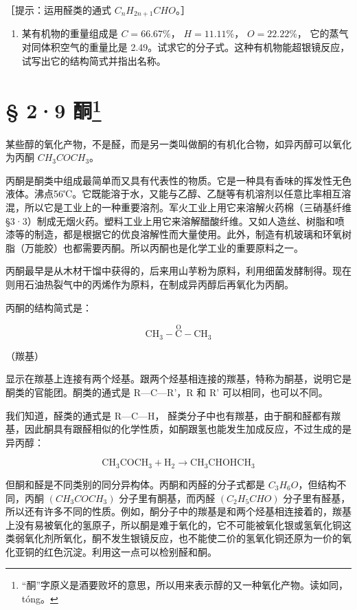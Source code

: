 ［提示：运用醛类的通式 \(C_{n}H_{2n+1}CHO\)。］

\begin{enumerate}[start=5]
\item
  某有机物的重量组成是 \(C = 66.67\%\)， \(H = 11.11\%\)，
  \(O = 22.22\%\)， 它的蒸气对同体积空气的重量比是
  2.49。试求它的分子式。这种有机物能超银镜反应，
  试写出它的结构简式并指出名称。
\end{enumerate}

\section[§ 2·9 酮]{\texorpdfstring{§ 2·9
酮\footnote{``酮''字原义是酒要败坏的意思，所以用来表示醇的又一种氧化产物。读如同，tóng。}}{§ 2·9 酮}}

某些醇的氧化产物，不是醛，而是另一类叫做酮的有机化合物，如异丙醇可以氧化为丙酮
\(CH_{3}COCH_{3}\)。

丙酮是酮类中组成最简单而又具有代表性的物质。它是一种具有香味的挥发性无色液体。沸点56℃。它既能溶于水，又能与乙醇、乙醚等有机溶剂以任意比率相互溶混，所以它是工业上的一种重要溶剂。军火工业上用它来溶解火药棉（三硝基纤维§3·3）制成无烟火药。塑料工业上用它来溶解醋酸纤维。又如人造丝、树脂和喷漆等的制造，都是根据它的优良溶解性而大量使用。此外，制造有机玻璃和环氧树脂（万能胶）也都需要丙酮。所以丙酮也是化学工业的重要原料之一。

丙酮最早是从木材干馏中获得的，后来用山芋粉为原料，利用细菌发酵制得。现在则用石油热裂气中的丙烯作为原料，在制成异丙醇后再氧化为丙酮。

丙酮的结构简式是：

\[
\mathrm{CH} _ {3} - \stackrel {\mathrm{O}} {\mathrm{C}} - \mathrm{CH} _ {3}
\]

（羰基）

显示在羰基上连接有两个烃基。跟两个烃基相连接的羰基，特称为酮基，说明它是酮类的官能团。酮类的通式是
R---C---R'，R 和 R' 可以相同，也可以不同。

我们知道，醛类的通式是 R---C---H，
醛类分子中也有羰基，由于酮和醛都有羰基，因此酮具有跟醛相似的化学性质，如酮跟氢也能发生加成反应，不过生成的是异丙醇：

\[
\mathrm{CH}_{3}\mathrm{CO}\mathrm{CH}_{3}+\mathrm{H}_{2}\rightarrow\mathrm{CH}_{3}\mathrm{CHOH}\mathrm{CH}_{3}
\]

但酮和醛是不同类别的同分异构体。丙酮和丙醛的分子式都是
\(C_{3}H_{6}O\)，但结构不同，丙酮 \((CH_{3}COCH_{3})\)
分子里有酮基，而丙醛 \((C_{2}H_{5}CHO)\)
分子里有醛基，所以还有许多不同的性质。例如，酮分子中的羰基是和两个烃基相连接着的，羰基上没有易被氧化的氢原子，所以酮是难于氧化的，它不可能被氧化银或氢氧化铜这类弱氧化剂所氧化，酮不发生银镜反应，也不能使二价的氢氧化铜还原为一价的氧化亚铜的红色沉淀。利用这一点可以检别醛和酮。

